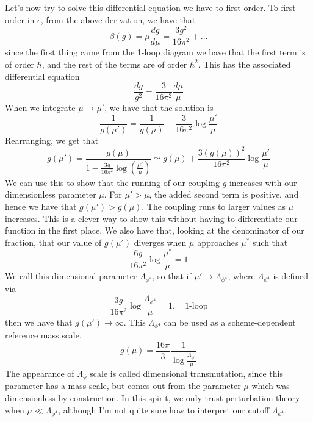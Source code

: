 \documentclass[11pt, oneside]{article}   	%
\theoremstyle{slanted}
\begin{document}
Let's now try to 
solve this differential equation 
we have to first order. 
To first order in $ \epsilon $, 
from the above derivation, we have that 
\[
\beta \left( g  \right)   = \mu \frac{dg }{ d \mu }  = 
\frac{3 g ^ 2 }{ 16 \pi ^ 2 } + \dots 
\] since the first thing came from 
the 1-loop diagram we have that the first term is of 
order $ \hbar $, and the rest of the terms 
are of order $ \hbar ^ 2 $. 
This has the associated differential equation 
\[
\frac{dg }{ g ^2  }  = \frac{3 }{ 16 \pi ^ 2  } \frac{d \mu }{ \mu } 
\]  When we integrate 
$ \mu \to \mu  '  $, 
we have that the solution is 
\[
\frac{1}{g \left( \mu  '  \right)  }  = \frac{1}{g \left( \mu  \right)  } 
 - \frac{3}{16 \pi ^ 2 } \log \frac{\mu ' }{ \mu } 
\] Rearranging, we get that 
\[
g \left( \mu  '  \right)   = \frac{g \left( \mu  \right)  }{ 
1 - \frac{ 3g }{ 16 \pi ^ 2 } \log \left( \frac{\mu ' }{ \mu }  \right)  } 
\simeq g \left( \mu  \right)  + \frac{ 3 \left( g \left(  \mu  \right)   \right)^  2  }{ 
16 \pi ^ 2 } \log \frac{\mu ' }{ \mu } 
\]  We can 
use this to show that the 
running of our coupling $ g $ increases 
with our dimensionless 
parameter $ \mu$. For $ \mu ' > \mu  $, the added
second term is positive, and hence we have that $ g \left(  \mu '   \right) > 
g \left( \mu  \right)  $. 
The coupling runs to larger values as $ \mu $ increases. This 
is a clever way to show this 
without having to differentiate 
our function in the 
first place. 
We also have that, looking 
at the denominator of our fraction, 
that our value of $ g \left( \mu  '  \right)  $ diverges 
when $ \mu $ approaches $ \mu ^ * $ such that 
\[
\frac{6g }{ 16 \pi ^ 2 } \log \frac{\mu ^ * }{ \mu }  = 1
\] We call this dimensional 
parameter $ \Lambda _{ \phi ^ 4 } $, so that  
if $ \mu ' \to \Lambda _{ \phi ^ 4}$, 
where $ \Lambda _{ \phi ^ 4 }$ is defined via 
\[
\frac{3g }{ 16 \pi ^ 2 } \log \frac{\Lambda_{ \phi ^ 4 }}{ \mu }  = 1 , \quad \text{1-loop}
\] then we have that 
$ g \left( \mu  '  \right) \to \infty $. 
This $ \Lambda _{ \phi ^4 }  $ can be used 
as a scheme-dependent reference mass scale. 
\[
g \left( \mu  \right)   = \frac{16 \pi }{ 3 } \frac{1}{
\log \frac{\Lambda_{ \phi ^ 4 } }{ \mu } }
\] The appearance of 
$ \Lambda _{ \phi } $ scale 
is called dimensional transmutation, since 
this parameter has a mass scale, but 
comes out from the parameter $ \mu $ which 
was dimensionless by construction.
In this spirit,  we only 
trust perturbation theory when $ \mu \ll \Lambda _{ \phi ^ 4 }  $, 
although I'm not quite 
sure how to interpret our cutoff $ \Lambda _{ \phi ^ 4 } $. 
\end{document}
